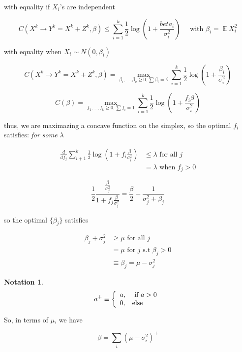 \documentclass{article}
\newtheorem{notation}{Notation}
\theoremstyle{definition} %
\DeclareMathOperator{\E}{\mathbb{E}}%
\begin{document}
with equality if $X_i$'s are independent

\[
  C(X^k \rightarrow Y^k = X^k + Z^k, \beta) \leq \sum_{i = 1}^k \frac{1}{2} \log(1 + \frac{beta_i}{\sigma^2_i}) \quad \text{ with } \beta_i = \E{X_i^2}
\]

with equality when $X_i \sim N(0, \beta_i)$

\[
  C(X^k \rightarrow Y^k = X^k + Z^k, \beta) = \max_{\beta_1, ..., \beta_k \geq 0, \sum \beta_i = \beta} \sum_{i = 1}^k \frac{1}{2} \log(1 + \frac{\beta_i}{\sigma^2_i})
\]

\[
  C(\beta) = \max_{f_1, ..., f_k \geq 0, \sum f_i = 1} \sum_{i = 1}^k \frac{1}{2} \log(1 + \frac{f_i \beta}{\sigma^2_i})
\]

thus, we are maximazing a concave function on the simplex, so the optimal $f_i$ satisfies: \textit{for some $\lambda$}

\begin{align*}
  \frac{d}{d f_j} \sum_{i + 1}^k \frac{1}{2} \log(1 + f_i \frac{\beta}{\sigma_i^2}) &\leq \lambda \text{ for all $j$}\\
              &= \lambda \text{ when } f_j > 0
\end{align*}

\[
  \frac{1}{2} \frac{\frac{\beta}{\sigma^2_j}}{1 + f_j \frac{\beta}{\sigma^2_j}} = \frac{\beta}{2} - \frac{1}{\sigma_j^2 + \beta_j}
\]

so the optimal $\{\beta_j\}$ satisfies

\begin{align*}
  \beta_j + \sigma_j^2 &\geq \mu \text{ for all } j \\
                       &= \mu  \text{ for } j \text{ s.t } \beta_j > 0 \\
                       & \equiv \beta_j = \mu - \sigma_j^2
\end{align*}

\begin{notation}
  \begin{align*}
    a^+ \equiv
    \left\{
    \begin{array}{l l}
      a, & \text{ if } a > 0 \\
      0, & \text{else}
    \end{array}
    \right.
  \end{align*}
\end{notation}

So, in terms of $\mu$, we have

\[
  \beta = \sum_i(\mu - \sigma^2_i)^+
\]
\end{document}
